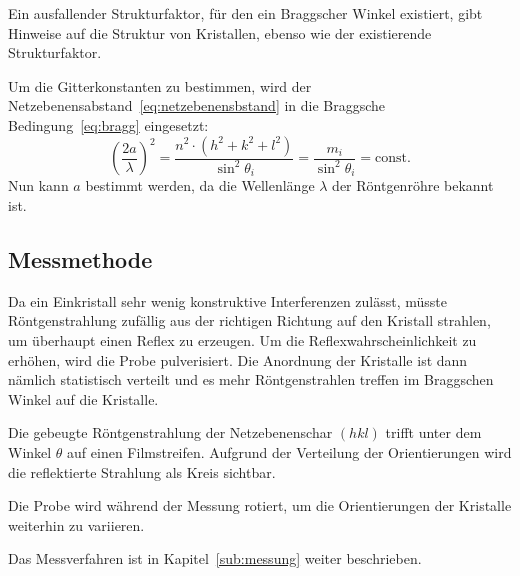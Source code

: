 Ein ausfallender Strukturfaktor, für den ein Braggscher Winkel existiert,
gibt Hinweise auf die Struktur von Kristallen,
ebenso wie der existierende Strukturfaktor.

Um die Gitterkonstanten zu bestimmen,
wird der Netzebenensabstand~\eqref{eq:netzebenensbstand}
in die Braggsche Bedingung~\eqref{eq:bragg} eingesetzt:
\begin{equation}
  \label{eq:const}
  {\left(\frac{2a}{\lambda}\right)}^2
  = \frac{n^2 \cdot \left(h^2 + k^2 + l^2\right)}{\sin^2\!\theta_i}
  = \frac{m_i}{\sin^2\!\theta_i} = \text{const.}
\end{equation}
Nun kann $a$ bestimmt werden, da die Wellenlänge $\lambda$ der Röntgenröhre bekannt ist.


\subsection{Messmethode}
\label{sec:Messmethode}
Da ein Einkristall sehr wenig konstruktive Interferenzen zulässt,
müsste Röntgenstrahlung zufällig aus der richtigen Richtung auf den Kristall
strahlen, um überhaupt einen Reflex zu erzeugen.
Um die Reflexwahrscheinlichkeit zu erhöhen, wird die Probe pulverisiert.
Die Anordnung der Kristalle ist dann nämlich statistisch verteilt
und es mehr Röntgenstrahlen treffen im Braggschen Winkel auf die Kristalle.

Die gebeugte Röntgenstrahlung der Netzebenenschar $(hkl)$ trifft unter
dem Winkel $\theta$ auf einen Filmstreifen.
Aufgrund der Verteilung der Orientierungen wird die reflektierte Strahlung
als Kreis sichtbar.

Die Probe wird während der Messung rotiert, um die Orientierungen der Kristalle
weiterhin zu variieren.

Das Messverfahren ist in Kapitel~\ref{sub:messung} weiter beschrieben.


